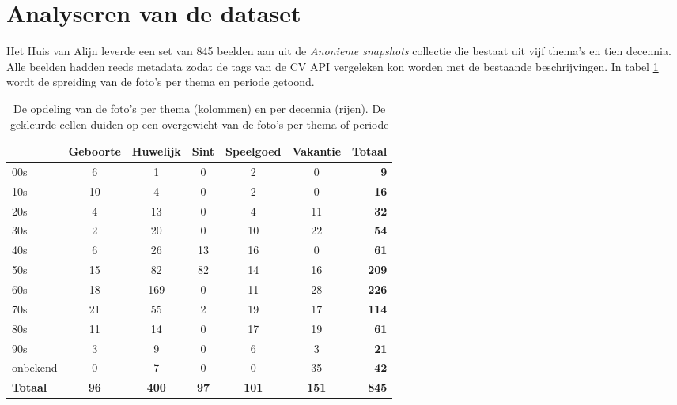 \section{Analyseren van de dataset}
\label{sec:analyseren-van-de-dataset}

Het Huis van Alijn leverde een set van 845 beelden aan uit de \textit{Anonieme snapshots} collectie die bestaat uit vijf thema’s en tien decennia. Alle beelden hadden reeds metadata zodat de tags van de CV API vergeleken kon worden met de bestaande beschrijvingen. In tabel  \ref{tab:analyse-dataset} wordt de spreiding van de foto’s per thema en periode getoond.

\begin{table}
	\centering
	\begin{tabular}{l|ccccc|r}
		\toprule
		& Geboorte & Huwelijk & Sint & Speelgoed & Vakantie & Totaal \\
		\midrule
		00s & 6 & 1 & 0 &2 & 0 & \textbf{9} \\
		10s & 10 & 4 & 0 & 2 & 0 & \textbf{16} \\
		20s & 4 & 13 & 0 & 4 & 11 & \textbf{32} \\
		30s & 2 & 20 & 0 & 10 & 22 & \textbf{54} \\
		40s & 6 & 26 & 13 & 16 & 0 & \textbf{61} \\
		50s & 15 & 82 & 82 & 14 & 16 & \textbf{209} \\
		60s & 18 & 169 & 0 & 11 & 28 & \textbf{226} \\
		70s & 21 & 55 & 2 & 19 & 17 & \textbf{114} \\
		80s & 11 & 14 & 0 & 17 & 19 & \textbf{61} \\
		90s & 3 & 9 & 0 & 6 & 3 & \textbf{21} \\
		onbekend & 0 & 7 & 0 & 0 & 35 & \textbf{42} \\
		\midrule
		\textbf{Totaal} & \textbf{96} & \textbf{400} & \textbf{97} & \textbf{101} & \textbf{151} & \textbf{845} \\
		\bottomrule
	\end{tabular}
	\caption[opdeling van de foto’s per thema en decennia]{De opdeling van de foto’s per thema (kolommen) en per decennia (rijen). De gekleurde cellen duiden op een overgewicht van de foto’s per thema of periode}
	\label{tab:analyse-dataset}
\end{table}

